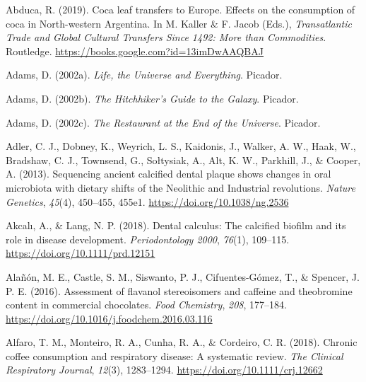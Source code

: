 \documentclass[
  letterpaper,
]{book}
\newlength{\cslhangindent}
\newlength{\cslentryspacingunit} %
\newenvironment{CSLReferences}[2] %
 {%
  \setlength{\parindent}{0pt}
  \ifodd #1
  \let\oldpar\par
  \def\par{\hangindent=\cslhangindent\oldpar}
  \fi
  \setlength{\parskip}{#2\cslentryspacingunit}
 }%
 {}
\begin{document}
\hypertarget{refs}{}
\begin{CSLReferences}{1}{0}
\leavevmode{}%
Abduca, R. (2019). Coca leaf transfers to {Europe}. {Effects} on the
consumption of coca in {North-western Argentina}. In M. Kaller \& F.
Jacob (Eds.), \emph{Transatlantic {Trade} and {Global Cultural Transfers
Since} 1492: {More} than {Commodities}}. {Routledge}.
\url{https://books.google.com?id=13imDwAAQBAJ}

\leavevmode{}%
Adams, D. (2002a). \emph{Life, the {Universe} and {Everything}}.
{Picador}.

\leavevmode{}%
Adams, D. (2002b). \emph{The {Hitchhiker}'s {Guide} to the {Galaxy}}.
{Picador}.

\leavevmode{}%
Adams, D. (2002c). \emph{The {Restaurant} at the {End} of the
{Universe}}. {Picador}.

\leavevmode{}%
Adler, C. J., Dobney, K., Weyrich, L. S., Kaidonis, J., Walker, A. W.,
Haak, W., Bradshaw, C. J., Townsend, G., Sołtysiak, A., Alt, K. W.,
Parkhill, J., \& Cooper, A. (2013). Sequencing ancient calcified dental
plaque shows changes in oral microbiota with dietary shifts of the
{Neolithic} and {Industrial} revolutions. \emph{Nature Genetics},
\emph{45}(4), 450--455, 455e1. \url{https://doi.org/10.1038/ng.2536}

\leavevmode{}%
Akcalı, A., \& Lang, N. P. (2018). Dental calculus: The calcified
biofilm and its role in disease development. \emph{Periodontology 2000},
\emph{76}(1), 109--115. \url{https://doi.org/10.1111/prd.12151}

\leavevmode{}%
Alañón, M. E., Castle, S. M., Siswanto, P. J., Cifuentes-Gómez, T., \&
Spencer, J. P. E. (2016). Assessment of flavanol stereoisomers and
caffeine and theobromine content in commercial chocolates. \emph{Food
Chemistry}, \emph{208}, 177--184.
\url{https://doi.org/10.1016/j.foodchem.2016.03.116}

\leavevmode{}%
Alfaro, T. M., Monteiro, R. A., Cunha, R. A., \& Cordeiro, C. R. (2018).
Chronic coffee consumption and respiratory disease: {A} systematic
review. \emph{The Clinical Respiratory Journal}, \emph{12}(3),
1283--1294. \url{https://doi.org/10.1111/crj.12662}


\end{CSLReferences}
\end{document}
